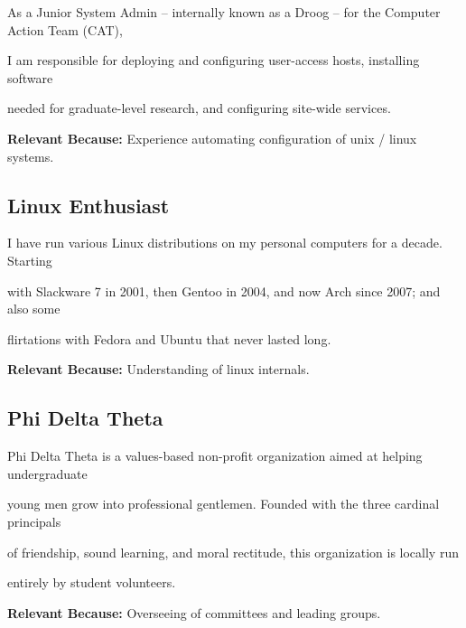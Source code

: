 \documentclass[10pt,letterpaper]{article}
\renewenvironment{itemize}{
  \begin{list}{}{
    \setlength{\leftmargin}{1.5em}
    \setlength{\itemsep}{0em}
    \setlength{\parskip}{0pt}
    \setlength{\parsep}{0em}
  }
}{
  \end{list}
}
\begin{document}
\begin{itemize}

    \item As a Junior System Admin -- internally known as a Droog -- for the Computer Action Team (CAT),
    \item I am responsible for deploying and configuring user-access hosts, installing software
    \item needed for graduate-level research, and configuring site-wide services.
    \item \textbf{Relevant Because:} Experience automating configuration of unix / linux systems.

\end{itemize}

\subsection*{Linux Enthusiast}

\begin{itemize}

    \item I have run various Linux distributions on my personal computers for a decade.  Starting
    \item with Slackware 7 in 2001, then Gentoo in 2004, and now Arch since 2007; and also some
    \item flirtations with Fedora and Ubuntu that never lasted long.
    \item \textbf{Relevant Because:} Understanding of linux internals.

\end{itemize}

\subsection*{Phi Delta Theta}

\begin{itemize}

    \item Phi Delta Theta is a values-based non-profit organization aimed at helping undergraduate
    \item young men grow into professional gentlemen.  Founded with the three cardinal principals
    \item of friendship, sound learning, and moral rectitude, this organization is locally run
    \item entirely by student volunteers.
    \item \textbf{Relevant Because:} Overseeing of committees and leading groups.

\end{itemize}
\end{document}
